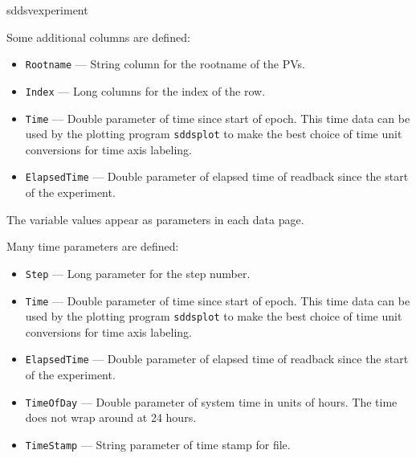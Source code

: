 \begin{sddsprog}{sddsvexperiment}
\begin{itemize}
Some additional columns are defined:
\begin{itemize}
   \item {\verb+Rootname+} --- String column for the rootname of the PVs.
   \item {\verb+Index+} --- Long columns for the index of the row.
   \item {\tt Time} --- Double parameter of time since start of epoch. This time data can be used by
        the plotting program {\verb+sddsplot+} to make the best choice of time unit conversions
        for time axis labeling.
   \item {\tt ElapsedTime} --- Double parameter of elapsed time of readback since the start of the experiment.
\end{itemize}

The variable values appear as parameters in each data page.

Many time parameters are defined:
\begin{itemize}
   \item {\verb+Step+} --- Long parameter for the step number.
   \item {\tt Time} --- Double parameter of time since start of epoch. This time data can be used by
        the plotting program {\verb+sddsplot+} to make the best choice of time unit conversions
        for time axis labeling.
   \item {\tt ElapsedTime} --- Double parameter of elapsed time of readback since the start of the experiment.
   \item {\tt TimeOfDay} --- Double parameter of system time in units of hours. 
                The time does not wrap around at 24 hours.
   \item {\tt TimeStamp} --- String parameter of time stamp for file.
\end{itemize}

\end{itemize}


\end{sddsprog}
